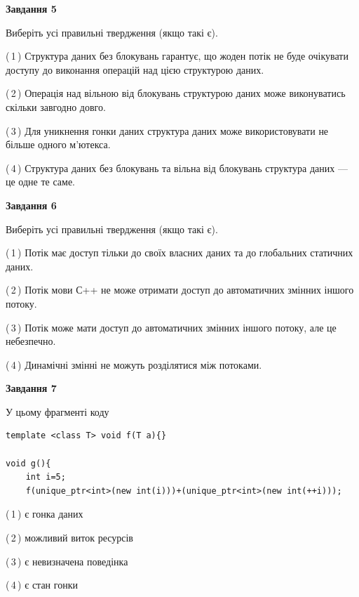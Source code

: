 \documentclass[12pt, ukrainian]{article}
\begin{document}
\begin {large}
{\begin{center}
\textbf{Завдання 5}
\end{center}

Виберіть усі правильні твердження (якщо такі є).\par
\vspace{2mm}

(\,1\,) Структура даних без блокувань гарантує, що жоден потік не буде очікувати доступу до виконання операцій над цією структурою даних.%

(\,2\,) Операція над вільною від блокувань структурою даних може виконуватись скільки завгодно довго.%

(\,3\,) Для уникнення гонки даних структура даних може використовувати не більше одного м’ютекса.%

(\,4\,) Структура даних без блокувань та вільна від блокувань структура даних --- це одне те саме.%
\newpage


\begin{center}
\textbf{Завдання 6}
\end{center}

Виберіть усі правильні твердження (якщо такі є).\par
\vspace{2mm}

(\,1\,) Потік має доступ тільки до своїх власних даних та до глобальних статичних даних.%

(\,2\,) Потік мови С++ не може отримати доступ до автоматичних змінних іншого потоку.%

(\,3\,) Потік може мати доступ до автоматичних змінних іншого потоку, але це небезпечно.%

(\,4\,) Динамічні змінні не можуть розділятися між потоками.%


\begin{center}
\textbf{Завдання 7}
\end{center}

У цьому фрагменті коду
\begin{verbatim}
template <class T> void f(T a){}

void g(){
    int i=5;
    f(unique_ptr<int>(new int(i)))+(unique_ptr<int>(new int(++i)));
\end{verbatim}
(\,1\,) є гонка даних%

(\,2\,) можливий виток ресурсів%

(\,3\,) є невизначена поведінка%

(\,4\,) є стан гонки%

}
\end {large}

\vspace{4mm}
\newpage
\end{document}
